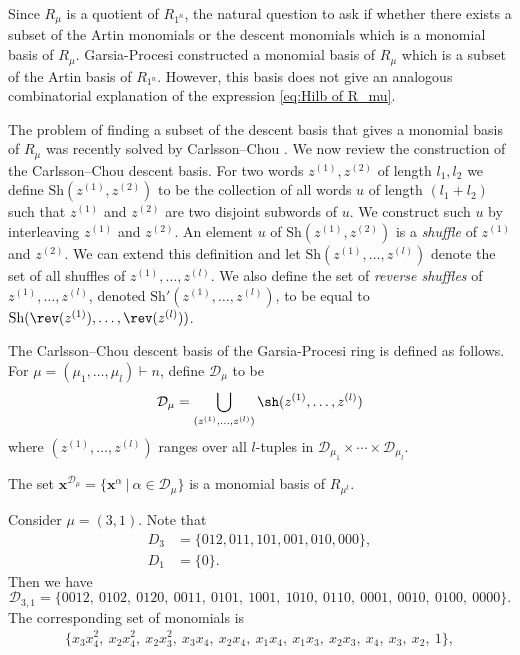 Since $R_\mu$  is a quotient of $R_{1^n}$, the natural question to ask if whether there exists a subset of the Artin monomials or the descent monomials which is a monomial basis of $R_\mu$.
Garsia-Procesi \cite{GP} constructed a monomial basis of $R_\mu$  which is a subset of the Artin basis of $R_{1^n}$. However, this basis does not give an analogous combinatorial explanation of the expression \eqref{eq:Hilb of R_mu}.

The problem of finding a subset of the descent basis that gives a monomial basis of $R_\mu$ was recently solved by Carlsson--Chou \cite{CC}.
We now review the construction of the Carlsson--Chou descent basis. 
For two words $z^{(1)},z^{(2)}$ of length $l_1, l_2$ we define $\text{Sh}(z^{(1)},z^{(2)})$ to be the collection of all words $u$ of length $(l_1+l_2)$ such that $z^{(1)}$ and $z^{(2)}$ are two disjoint subwords of $u$.
We construct such $u$ by interleaving $z^{(1)}$ and  $z^{(2)}$. An element $u$ of $\text{Sh}( z^{(1)},z^{(2)})$ is a \textit{shuffle} of $z^{(1)}$ and $z^{(2)}$. We can extend this definition and let $\text{Sh}(z^{(1)},\dots , z^{(l)})$ denote the set of all shuffles of $z^{(1)},\dots , z^{(l)}$.
We also define the set of \textit{reverse shuffles}  of  $z^{(1)},\dots , z^{(l)}$, denoted $\text{Sh}'(z^{(1)},\dots , z^{(l)})$, to be equal to $\text{Sh}(\rev (z^{(1)}),\dots , \rev(z^{(l)}))$.

The Carlsson--Chou descent basis of the Garsia-Procesi ring is defined as follows. 
For $\mu = (\mu_1,\dots,\mu_l) \vdash n$, define $\mathcal{D}_\mu$ to be
\begin{align}
    \mathcal{D}_\mu = \bigcup_{(z^{(1)},\dots , z^{(l)})} \sh (z^{(1)},\dots , z^{(l)})
\end{align}
where $(z^{(1)},\dots , z^{(l)})$ ranges over all $l$-tuples in $\mathcal{D}_{\mu_1}\times \cdots \times \mathcal{D}_{\mu_l}$.

\begin{thm}
The set $\mathbf{x}^{\mathcal{D}_\mu} = \{\mathbf{x}^\alpha \ | \ \alpha \in  \mathcal{D}_\mu\}$  is a monomial basis of $R_{\mu^t}$. 
\end{thm}   

\begin{ex}\label{ex: 31}
    Consider $\mu = (3,1).$ Note that 
    \begin{align*}
        D_3 &= \{012,011, 101, 001,010, 000\},\\
        D_1 &= \{0\}.
    \end{align*}
  Then we have 
  \[\mathcal{D}_{3,1}  = \{0012,\ 0102,\ 0120, \ 0011, \ 0101, \ 1001, \ 1010, \ 0110,\  0001,\ 0010,\ 0100, \ 0000\} .\]
  The corresponding set of monomials is  
  \begin{align*}
       \{x_3x_4^2,
  \ x_2x_4^2, \ x_2x_3^2, \ x_3x_4 ,\  x_2x_4, \ x_1x_4, \ x_1x_3, \ x_2x_3, \ x_4, \ x_3 , \ x_2, \ 1\},
  \end{align*}
\end{ex}

